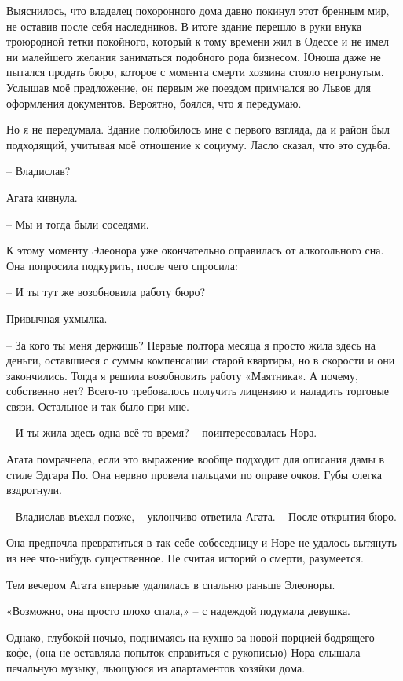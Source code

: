 \documentclass[
  a5paperpaper,
  DIV=11,
  numbers=noendperiod]{scrreprt}
\begin{document}
Выяснилось, что владелец похоронного дома давно покинул этот бренным
мир, не оставив после себя наследников. В итоге здание перешло в руки
внука троюродной тетки покойного, который к тому времени жил в Одессе и
не имел ни малейшего желания заниматься подобного рода бизнесом. Юноша
даже не пытался продать бюро, которое с момента смерти хозяина стояло
нетронутым. Услышав моё предложение, он первым же поездом примчался во
Львов для оформления документов. Вероятно, боялся, что я передумаю.

Но я не передумала. Здание полюбилось мне с первого взгляда, да и район
был подходящий, учитывая моё отношение к социуму. Ласло сказал, что это
судьба.

-- Владислав?

Агата кивнула.

-- Мы и тогда были соседями.

К этому моменту Элеонора уже окончательно оправилась от алкогольного
сна. Она попросила подкурить, после чего спросила:

-- И ты тут же возобновила работу бюро?

Привычная ухмылка.

-- За кого ты меня держишь? Первые полтора месяца я просто жила здесь на
деньги, оставшиеся с суммы компенсации старой квартиры, но в скорости и
они закончились. Тогда я решила возобновить работу «Маятника». А почему,
собственно нет? Всего-то требовалось получить лицензию и наладить
торговые связи. Остальное и так было при мне.

-- И ты жила здесь одна всё то время? -- поинтересовалась Нора.

Агата помрачнела, если это выражение вообще подходит для описания дамы в
стиле Эдгара По. Она нервно провела пальцами по оправе очков. Губы
слегка вздрогнули.

-- Владислав въехал позже, -- уклончиво ответила Агата. -- После
открытия бюро.

Она предпочла превратиться в так-себе-собеседницу и Норе не удалось
вытянуть из нее что-нибудь существенное. Не считая историй о смерти,
разумеется.

Тем вечером Агата впервые удалилась в спальню раньше Элеоноры.

«Возможно, она просто плохо спала,» -- с надеждой подумала девушка.

Однако, глубокой ночью, поднимаясь на кухню за новой порцией бодрящего
кофе, (она не оставляла попыток справиться с рукописью) Нора слышала
печальную музыку, льющуюся из апартаментов хозяйки дома.
\end{document}
